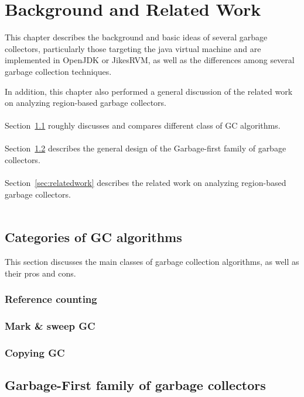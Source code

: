 \chapter{Background and Related Work}
\label{cha:background}

This chapter describes the background and basic ideas of several garbage collectors,
particularly those targeting the java virtual machine and are implemented in OpenJDK or JikesRVM,
as well as the differences among several garbage collection techniques.

In addition, this chapter also performed a general discussion of the related work
on analyzing region-based garbage collectors.
\\\\
Section~\ref{sec:gcalgorithms} roughly discusses and compares different class of GC algorithms.
\\\\
Section~\ref{sec:g1collectors} describes the general design of the Garbage-first family of garbage collectors.
\\\\
Section~\ref{sec:relatedwork} describes the related work on analyzing region-based garbage collectors.
\\\\
\section{Categories of GC algorithms}
\label{sec:gcalgorithms}

This section discusses the main classes of garbage collection algorithms, as well
as their pros and cons.

\subsection{Reference counting}



\subsection{Mark \& sweep GC}



\subsection{Copying GC}



\section{Garbage-First family of garbage collectors}
\label{sec:g1collectors}

